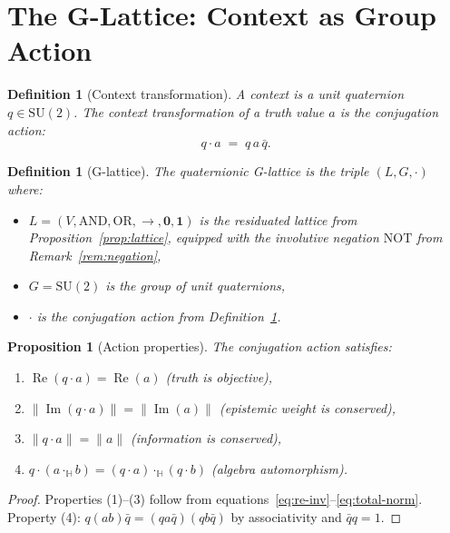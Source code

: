 \documentclass[11pt,a4paper]{article}
\newtheorem{proposition}[theorem]{Proposition}
\newtheorem{definition}[theorem]{Definition}
\newcommand{\Real}{\operatorname{Re}}
\newcommand{\Imag}{\operatorname{Im}}
\newcommand{\SU}{\mathrm{SU}(2)}
\begin{document}
\section{The G-Lattice: Context as Group Action}
\label{sec:glattice}

\begin{definition}[Context transformation]
\label{def:context}
A \emph{context} is a unit quaternion $q\in\SU$. The context
transformation of a truth value $a$ is the conjugation action:
\[
  q\cdot a \;=\; q\,a\,\bar{q}.
\]
\end{definition}

\begin{definition}[G-lattice]
\label{def:glattice}
The \emph{quaternionic G-lattice} is the triple $(L,G,\cdot)$ where:
\begin{itemize}[nosep]
\item $L=(V,\mathrm{AND},\mathrm{OR},\to,\mathbf{0},\mathbf{1})$ is the
  residuated lattice from Proposition~\ref{prop:lattice}, equipped
  with the involutive negation $\mathrm{NOT}$ from
  Remark~\ref{rem:negation},
\item $G=\SU$ is the group of unit quaternions,
\item $\cdot$ is the conjugation action from Definition~\ref{def:context}.
\end{itemize}
\end{definition}

\begin{proposition}[Action properties]
\label{prop:action}
The conjugation action satisfies:
\begin{enumerate}[nosep]
\item $\Real(q\cdot a)=\Real(a)$ \hfill(truth is objective),
\item $\|\Imag(q\cdot a)\|=\|\Imag(a)\|$ \hfill(epistemic weight is conserved),
\item $\|q\cdot a\|=\|a\|$ \hfill(information is conserved),
\item $q\cdot(a\cdot_{\mathbb{H}} b)=(q\cdot a)\cdot_{\mathbb{H}}(q\cdot b)$ \hfill(algebra automorphism).
\end{enumerate}
\end{proposition}

\begin{proof}
Properties (1)--(3) follow from equations~\eqref{eq:re-inv}--\eqref{eq:total-norm}.
Property (4): $q(ab)\bar{q}=(qa\bar{q})(qb\bar{q})$ by
associativity and $\bar{q}q=1$.
\end{proof}
\end{document}
